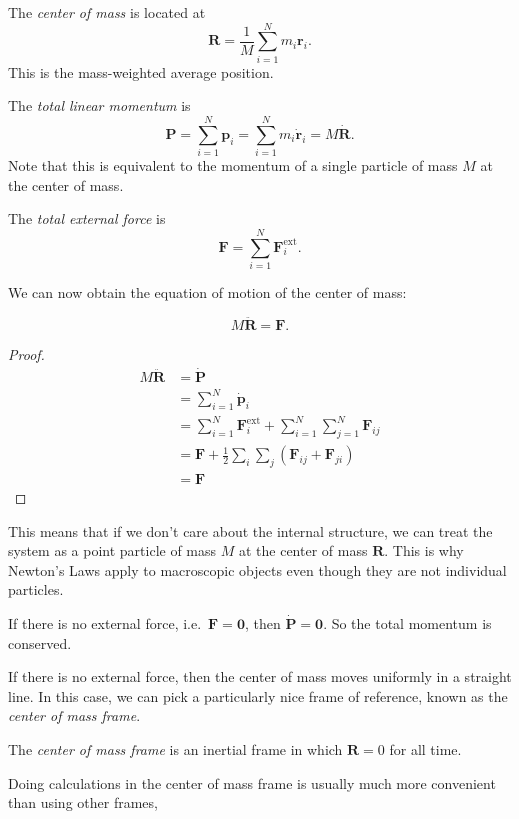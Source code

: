 \documentclass[a4paper]{article}
\begin{document}
\begin{defi}
  The \emph{center of mass} is located at
  \[
    \mathbf{R} = \frac{1}{M}\sum_{i = 1}^N m_i\mathbf{r}_i.
  \]
  This is the mass-weighted average position.
\end{defi}

\begin{defi}
  The \emph{total linear momentum} is
  \[
    \mathbf{P} = \sum_{i = 1}^N \mathbf{p}_i = \sum_{i = 1}^N m_i \dot{\mathbf{r}}_i = M\dot{\mathbf{R}}.
  \]
  Note that this is equivalent to the momentum of a single particle of mass $M$ at the center of mass.
\end{defi}

\begin{defi}
  The \emph{total external force} is
  \[
    \mathbf{F} = \sum_{i = 1}^N \mathbf{F}_i^{\text{ext}}.
  \]
\end{defi}

We can now obtain the equation of motion of the center of mass:
\begin{prop}
  \[
    M\ddot{\mathbf{R}} = \mathbf{F}.
  \]
\end{prop}

\begin{proof}
  \begin{align*}
    M\ddot{\mathbf{R}} &= \dot{\mathbf{P}}\\
    &= \sum_{i = 1}^N \dot{\mathbf{p}}_i\\
    &= \sum_{i = 1}^N \mathbf{F}_i^{\text{ext}} + \sum_{i = 1}^N\sum_{j = 1}^N \mathbf{F}_{ij}\\
    &= \mathbf{F} + \frac{1}{2}\sum_i \sum_j(\mathbf{F}_{ij} + \mathbf{F}_{ji})\\
    &= \mathbf{F}
  \end{align*}
\end{proof}
This means that if we don't care about the internal structure, we can treat the system as a point particle of mass $M$ at the center of mass $\mathbf{R}$. This is why Newton's Laws apply to macroscopic objects even though they are not individual particles.

\begin{law}
  If there is no external force, i.e.\ $\mathbf{F} = \mathbf{0}$, then $\dot{\mathbf{P}} = \mathbf{0}$. So the total momentum is conserved.
\end{law}

If there is no external force, then the center of mass moves uniformly in a straight line. In this case, we can pick a particularly nice frame of reference, known as the \emph{center of mass frame}.
\begin{defi}
  The \emph{center of mass frame} is an inertial frame in which $\mathbf{R} = 0$ for all time.
\end{defi}
Doing calculations in the center of mass frame is usually much more convenient than using other frames,
\end{document}
